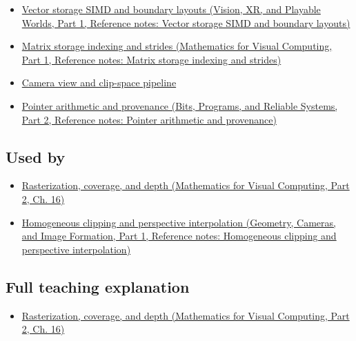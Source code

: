 \begin{itemize}
\tightlist
\item
  \href{../07-Vision-XR-and-Playable-Worlds-P01/main.pdf\#nameddest=appendix-26bf6bf2fb8b}{Vector storage SIMD and boundary layouts (Vision, XR, and Playable Worlds, Part 1, Reference notes: Vector storage SIMD and boundary layouts)}
\item
  \href{../02-Mathematics-for-Visual-Computing-P01/main.pdf\#nameddest=appendix-ffdc1d4e5350}{Matrix storage indexing and strides (Mathematics for Visual Computing, Part 1, Reference notes: Matrix storage indexing and strides)}
\item
  \hyperref[appendix-1c07d64f5e70]{Camera view and clip-space pipeline}
\item
  \href{../01-Bits-Programs-and-Reliable-Systems-P02/main.pdf\#nameddest=appendix-6af5921bc853}{Pointer arithmetic and provenance (Bits, Programs, and Reliable Systems, Part 2, Reference notes: Pointer arithmetic and provenance)}
\end{itemize}

\subsection{Used by}\label{appendix-749ba51a6c25-used-by}

\hypertarget{appendix-749ba51a6c25-used-by}{}

\begin{itemize}
\tightlist
\item
  \href{../02-Mathematics-for-Visual-Computing-P02/main.pdf\#nameddest=03-visual-computing-i-ch012-rasterization-coverage-and-depth}{Rasterization, coverage, and depth (Mathematics for Visual Computing, Part 2, Ch. 16)}
\item
  \href{../03-Geometry-Cameras-and-Image-Formation-P01/main.pdf\#nameddest=appendix-40426e4b2103}{Homogeneous clipping and perspective interpolation (Geometry, Cameras, and Image Formation, Part 1, Reference notes: Homogeneous clipping and perspective interpolation)}
\end{itemize}

\subsection{Full teaching explanation}\label{appendix-749ba51a6c25-full-teaching-explanation}

\hypertarget{appendix-749ba51a6c25-full-teaching-explanation}{}

\begin{itemize}
\tightlist
\item
  \href{../02-Mathematics-for-Visual-Computing-P02/main.pdf\#nameddest=03-visual-computing-i-ch012-rasterization-coverage-and-depth}{Rasterization, coverage, and depth (Mathematics for Visual Computing, Part 2, Ch. 16)}
\end{itemize}


